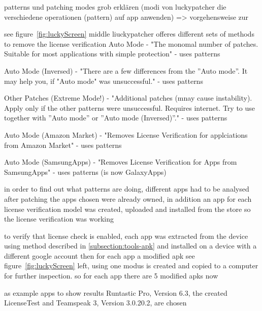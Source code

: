 patterns und patching modes grob erklären (modi von luckypatcher die verschiedene operationen (pattern) auf app anwenden) => vorgehensweise zur\newline

see figure~\ref{fig:luckyScreen} middle liuckypatcher offeres different sets of methods to remove the license verification
Auto Mode - "The monomal number of patches. Suitable for most applications with simple protection" - uses patterns

Auto Mode (Inversed) - "There are a few differences from the ”Auto mode”. It may help you, if "Auto mode" was unsuccessful." - uses patterns

Other Patches (Extreme Mode!) - "Additional patches (mnay cause instability). Apply only if the other patterns were unsuccessful. Requires internet. Try to use together with ”Auto mode” or ”Auto mode (Inversed)”." - uses patterns

Auto Mode (Amazon Market) - "Removes License Verification for applciations from Amazon Market" - uses patterns

Auto Mode (SamsungApps) - "Removes License Verification for Apps from SamsungApps" - uses patterns  (is now GalaxyApps)


in order to find out what patterns are doing, different apps had to be analysed after patching
the apps chosen were already owned, in addition an app for each license verification model was created, uploaded and installed from the store so the license verification was working

to verify that license check is enabled, each app was extracted from the device using method described in \ref{subsection:tools-apk} and installed on a device with a different google account
then for each app a modified apk see figure~\ref{fig:luckyScreen} left, using one modus is created and copied to a computer for further inspection. so for each app there are 5 modified apks now


as example apps to show results Runtastic Pro\cite{runtasticApp}, Version 6.3, the created LicenseTest and Teamspeak 3\cite{teamspeakApp}, Version 3.0.20.2, are chosen

